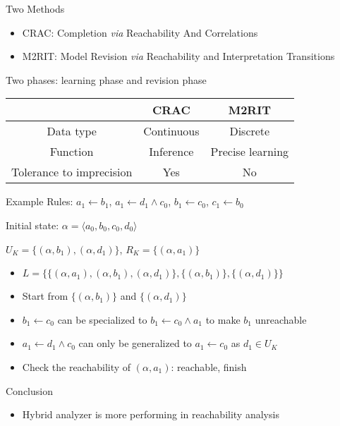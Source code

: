 \documentclass[8pt]{beamer}
\begin{document}
\begin{frame}{Two Methods}
\begin{itemize}
    \item CRAC: Completion \textit{via} Reachability And Correlations
    \item M2RIT: Model Revision \textit{via} Reachability and Interpretation Transitions
\end{itemize}

Two phases: learning phase and revision phase

\centering
    \begin{tabular}{c|c|c}
         &CRAC & M2RIT \\
         \hline
         Data type &Continuous & Discrete\\
         \hline
         Function &Inference & Precise learning\\
         \hline
         Tolerance to imprecision&Yes&No
    \end{tabular}
\end{frame}

\begin{frame}{Example}
    Rules: $a_1\gets b_1$, $a_1\gets d_1 \land c_0$, $b_1\gets c_0$, $c_1\gets b_0$
    
	Initial state: $\alpha=\langle a_0,b_0,c_0,d_0\rangle$
	
	$U_K=\{(\alpha,b_1),(\alpha,d_1)\}$, $R_K=\{(\alpha,a_1)\}$
    \begin{figure}
        \centering
        
    \end{figure}
    
     \begin{itemize}
        \item $L=\{\{(\alpha,a_1),(\alpha,b_1),(\alpha,d_1)\},\{(\alpha,b_1)\},\{(\alpha,d_1)\}\}$
        \item Start from $\{(\alpha,b_1)\}$ and $\{(\alpha,d_1)\}$
        \item $b_1\gets c_0$ can be specialized to $b_1\gets c_0\land a_1$ to make $b_1$ unreachable
        \item $a_1\gets d_1 \land c_0$ can only be generalized to $a_1 \gets c_0$ as $d_1\in U_K$
        \item Check the reachability of $(\alpha,a_1)$: reachable, finish
    \end{itemize}
\end{frame}

\begin{frame}{Conclusion}
\begin{itemize}
    \item Hybrid analyzer is more performing in reachability analysis
\end{itemize}

\end{frame}

%    
%    
\end{document}
